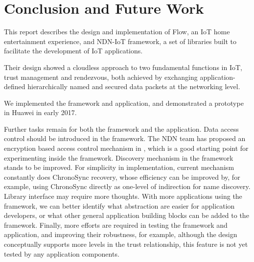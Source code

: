 \section{Conclusion and Future Work}
\label{sec:conclusion}

This report describes the design and implementation of Flow, an IoT home entertainment experience, and NDN-IoT framework, a set of libraries built to facilitate the development of IoT applications.

Their design showed a cloudless approach to two fundamental functions in IoT, trust management and rendezvous, both achieved by exchanging application-defined hierarchically named and secured data packets at the networking level.

We implemented the framework and application, and demonstrated a prototype in Huawei in early 2017.

Further tasks remain for both the framework and the application. 
Data access control should be introduced in the framework. The NDN team has proposed an encryption based access control mechanism in \cite{nbac}, which is a good starting point for experimenting inside the framework.
Discovery mechanism in the framework stands to be improved. For simplicity in implementation, current mechanism constantly does ChronoSync recovery, whose efficiency can be improved by, for example, using ChronoSync directly as one-level of indirection for name discovery.
Library interface may require more thoughts. With more applications using the framework, we can better identify what abstraction are easier for application developers, or what other general application building blocks can be added to the framework.
Finally, more efforts are required in testing the framework and application, and improving their robustness, for example, although the design conceptually supports more levels in the trust relationship, this feature is not yet tested by any application components.